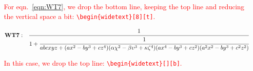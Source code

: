 \begin{table}[b]
\caption{\label{tab:3}Table at full column width with columns in math mode}
\end{table}

\lipsum[40-54]

\textcolor{red}{For eqn.~\eqref{eqn:WT7}, we drop the bottom line, keeping the top line and reducing the vertical space a bit: \texttt{\textbackslash begin\{widetext\}[8][t]}.}
\begin{widetext}[8][t]
\begin{equation}\label{eqn:WT7}
\mathbf{WT7:}\quad
\cfrac{1}{1+ \cfrac{1}{abcxyz+(ax^2-by^3+cz^4)(\alpha\chi^2-\beta\upsilon^3+\kappa\zeta^4)(ax^4-by^3+cz^2)(a^2x^2-by^3+c^2z^2)}}
\end{equation}
\end{widetext}

\lipsum[50-63]

\textcolor{red}{In this case, we drop the top line: \texttt{\textbackslash begin\{widetext\}[][b]}.}

\vskip 80pt%

